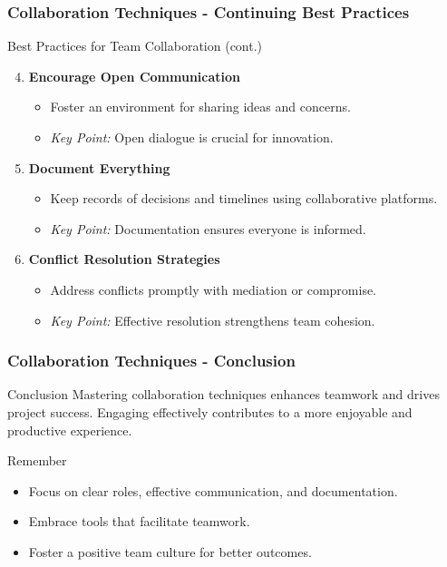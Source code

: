 \documentclass[aspectratio=169]{beamer}
\begin{document}
\begin{frame}[fragile]
  \frametitle{Collaboration Techniques - Continuing Best Practices}
  \begin{block}{Best Practices for Team Collaboration (cont.)}
    \begin{enumerate}
      \setcounter{enumi}{3}
      \item \textbf{Encourage Open Communication}
        \begin{itemize}
          \item Foster an environment for sharing ideas and concerns.
          \item \textit{Key Point:} Open dialogue is crucial for innovation.
        \end{itemize}
      \item \textbf{Document Everything}
        \begin{itemize}
          \item Keep records of decisions and timelines using collaborative platforms.
          \item \textit{Key Point:} Documentation ensures everyone is informed.
        \end{itemize}
      \item \textbf{Conflict Resolution Strategies}
        \begin{itemize}
          \item Address conflicts promptly with mediation or compromise.
          \item \textit{Key Point:} Effective resolution strengthens team cohesion.
        \end{itemize}
    \end{enumerate}
  \end{block}
\end{frame}

\begin{frame}[fragile]
  \frametitle{Collaboration Techniques - Conclusion}
  \begin{block}{Conclusion}
    Mastering collaboration techniques enhances teamwork and drives project success. Engaging effectively contributes to a more enjoyable and productive experience.
  \end{block}
  
  \begin{block}{Remember}
    \begin{itemize}
      \item Focus on clear roles, effective communication, and documentation.
      \item Embrace tools that facilitate teamwork.
      \item Foster a positive team culture for better outcomes.
    \end{itemize}
  \end{block}
\end{frame}
\end{document}
